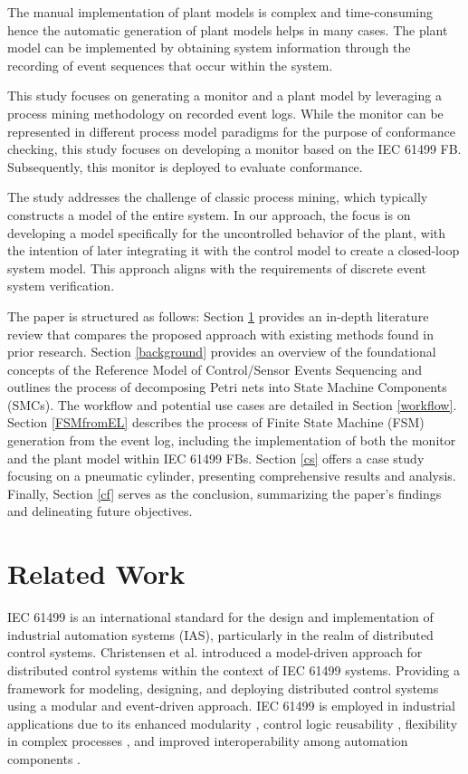 \documentclass{ieeeojies}
\begin{document}
The manual implementation of plant models \cite{hanisch2009one, hegny2010iec} is complex and time-consuming hence the automatic generation of plant models \cite{xavier2021plant, xavier2022plant}  helps in many cases. The plant model can be implemented by obtaining system information through the recording of event sequences that occur within the system. 


This study focuses on generating a monitor and a plant model by leveraging a process mining methodology on recorded event logs. While the monitor can be represented in different process model paradigms for the purpose of conformance checking, this study focuses on developing a monitor based on the IEC 61499 FB. Subsequently, this monitor is deployed to evaluate conformance.


The study addresses the challenge of classic process mining, which typically constructs a model of the entire system. In our approach, the focus is on developing a model specifically for the uncontrolled behavior of the plant, with the intention of later integrating it with the control model to create a closed-loop system model. This approach aligns with the requirements of discrete event system verification.



The paper is structured as follows:  Section \ref{rw} provides an in-depth literature review that compares the proposed approach with existing methods found in prior research. Section \ref{background} provides an overview of the foundational concepts of the Reference Model of Control/Sensor Events Sequencing and outlines the process of decomposing Petri nets into State Machine Components (SMCs). The workflow and potential use cases are detailed in Section \ref{workflow}. Section \ref{FSMfromEL} describes the process of Finite State Machine (FSM) generation from the event log, including the implementation of both the monitor and the plant model within IEC 61499 FBs. Section \ref{cs} offers a case study focusing on a pneumatic cylinder, presenting comprehensive results and analysis. Finally, Section \ref{cf} serves as the conclusion, summarizing the paper's findings and delineating future objectives.


\section{Related Work }
\label{rw}
\hfill 

IEC 61499 \cite{iec61499part12012} is an international standard for the design and implementation of industrial automation systems (IAS), particularly in the realm of distributed control systems.  Christensen et al. \cite{christensen2000design} introduced a model-driven approach for distributed control systems within the context of IEC 61499 systems. Providing a framework for modeling, designing, and deploying distributed control systems using a modular and event-driven approach. IEC 61499 is employed in industrial applications due to its enhanced modularity \cite{thramboulidis2013iec}, control logic reusability \cite{hegny2012towards}, flexibility in complex processes \cite{dai2015bridging}, and improved interoperability among automation components \cite{sunder2006usability}.
\end{document}
